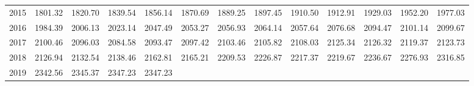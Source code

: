 \begin{longtable}{rrrrrrrrrrrrr}
  2015 & 1801.32 & 1820.70 & 1839.54 & 1856.14 & 1870.69 & 1889.25 & 1897.45 & 1910.50 & 1912.91 & 1929.03 & 1952.20 & 1977.03 \\ 
  2016 & 1984.39 & 2006.13 & 2023.14 & 2047.49 & 2053.27 & 2056.93 & 2064.14 & 2057.64 & 2076.68 & 2094.47 & 2101.14 & 2099.67 \\ 
  2017 & 2100.46 & 2096.03 & 2084.58 & 2093.47 & 2097.42 & 2103.46 & 2105.82 & 2108.03 & 2125.34 & 2126.32 & 2119.37 & 2123.73 \\ 
  2018 & 2126.94 & 2132.54 & 2138.46 & 2162.81 & 2165.21 & 2209.53 & 2226.87 & 2217.37 & 2219.67 & 2236.67 & 2276.93 & 2316.85 \\ 
  2019 & 2342.56 & 2345.37 & 2347.23 & 2347.23 &  &  &  &  &  &  &  &  \\ 
   \hline
\hline
\end{longtable}
